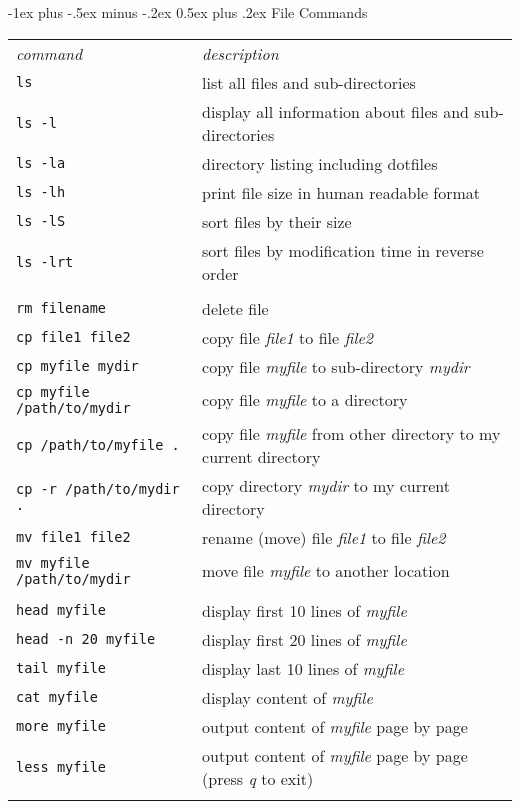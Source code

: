 \documentclass[10pt,landscape]{article}
\makeatletter
\renewcommand{\section}{\@startsection{section}{1}{0mm}%
                                {-1ex plus -.5ex minus -.2ex}%
                                {0.5ex plus .2ex}%
                                {\normalfont\large\bfseries}}
\makeatother
\begin{document}
\begin{multicols}{2}
\section{File Commands}
\begin{tabular}{ll}
\emph{command} & \emph{description} \\

\verb!ls! & list all files and sub-directories\\
\texttt{ls -l} & display all information about files and sub-directories\\
\texttt{ls -la} & directory listing including dotfiles\\
\texttt{ls -lh} & print file size in human readable format\\
\texttt{ls -lS} & sort files by their size\\
\texttt{ls -lrt} & sort files by modification time in reverse order\\\\
\texttt{rm filename} & delete file\\
\texttt{cp file1 file2} & copy file \textit{file1} to file \textit{file2}\\
\texttt{cp myfile mydir} & copy file \textit{myfile} to sub-directory \textit{mydir}\\
\texttt{cp myfile /path/to/mydir} & copy file \textit{myfile} to a directory\\
\texttt{cp /path/to/myfile  .} & copy file \textit{myfile} from other directory to my current directory\\
\texttt{cp -r /path/to/mydir  .} & copy directory \textit{mydir} to my current directory\\
\texttt{mv file1 file2} & rename (move) file \textit{file1} to file \textit{file2}\\
\texttt{mv myfile /path/to/mydir} & move file \textit{myfile} to another location\\\\
\texttt{head myfile} & display first 10 lines of  \textit{myfile} \\
\texttt{head -n 20 myfile} & display first 20 lines of  \textit{myfile} \\
\texttt{tail myfile} & display last 10 lines of  \textit{myfile} \\
\texttt{cat myfile} & display content of  \textit{myfile} \\
\texttt{more myfile} & output content of \textit{myfile} page by page \\
\texttt{less myfile} & output content of \textit{myfile} page by page (press \textit{q} to exit)\\\\

\end{tabular}
\end{multicols}
\end{document}
